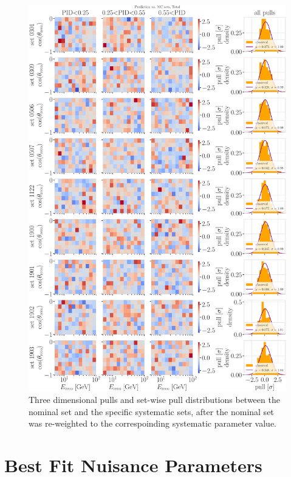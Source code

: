 \begin{figure}[h]
    \includegraphics{figures/results/utlrasurfaces/oscNext_leptoninjector_1.0_GeV_knn_probs_neighbors_500_weighted_nfiles_extended_holeice_corrected_grads_poly_2_weighted_reference_weight_0.0100_thesis_style_subset_1-5.png}
    \caption[Detector systematic uncertainty treatment bin-wise pulls additional sets]{Three dimensional pulls and set-wise pull distributions between the nominal set and the specific systematic sets, after the nominal set was re-weighted to the correspoinding systematic parameter value.}
\end{figure}


\section{Best Fit Nuisance Parameters}

